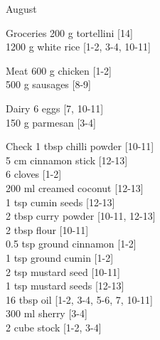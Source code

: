 \begin{menu}{August}
\begin{shoppinglist}{Groceries}
      200 g tortellini 
        {\scriptsize[14]}\\
      1200 g white rice 
        {\scriptsize[1-2, 3-4, 10-11]}\\
      \end{shoppinglist}%
      \par\vfil %
      \begin{shoppinglist}{Meat}
      600 g chicken 
        {\scriptsize[1-2]}\\
      500 g sausages 
        {\scriptsize[8-9]}\\
      \end{shoppinglist}%
      \begin{shoppinglist}{Dairy}
      6  eggs 
        {\scriptsize[7, 10-11]}\\
      150 g parmesan 
        {\scriptsize[3-4]}\\
      \end{shoppinglist}%
      \par\vfil %
      \vfil\clearpage %
      \begin{shoppinglist}{Check}
      1 tbsp chilli powder 
        {\scriptsize[10-11]}\\
      5 cm cinnamon stick 
        {\scriptsize[12-13]}\\
      6  cloves 
        {\scriptsize[1-2]}\\
      200 ml creamed coconut 
        {\scriptsize[12-13]}\\
      1 tsp cumin seeds 
        {\scriptsize[12-13]}\\
      2 tbsp curry powder 
        {\scriptsize[10-11, 12-13]}\\
      2 tbsp flour 
        {\scriptsize[10-11]}\\
      0.5 tsp ground cinnamon 
        {\scriptsize[1-2]}\\
      1 tsp ground cumin 
        {\scriptsize[1-2]}\\
      2 tsp mustard seed 
        {\scriptsize[10-11]}\\
      1 tsp mustard seeds 
        {\scriptsize[12-13]}\\
      16 tbsp oil 
        {\scriptsize[1-2, 3-4, 5-6, 7, 10-11]}\\
      300 ml sherry 
        {\scriptsize[3-4]}\\
      2 cube stock 
        {\scriptsize[1-2, 3-4]}\\
      \end{shoppinglist}%

\end{menu}
